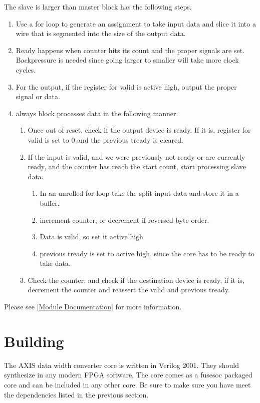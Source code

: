 \par
The slave is larger than master block has the following steps.
\begin{enumerate}
\item Use a for loop to generate an assignment to take input data and slice it into a wire that is segmented into the size of the output data.
\item Ready happens when counter hits its count and the proper signals are set. Backpressure is needed since going larger to smaller will take more clock cycles.
\item For the output, if the register for valid is active high, output the proper signal or data.
\item always block processes data in the following manner.
  \begin{enumerate}
    \item Once out of reset, check if the output device is ready. If it is, register for valid is set to 0 and the previous tready is cleared.
    \item If the input is valid, and we were previously not ready or are currently ready, and the counter has reach the start count, start processing slave data.
    \begin{enumerate}
      \item In an unrolled for loop take the split input data and store it in a buffer.
      \item increment counter, or decrement if reversed byte order.
      \item Data is valid, so set it active high
      \item previous tready is set to active high, since the core has to be ready to take data.
    \end{enumerate}
    \item Check the counter, and check if the destination device is ready, if it is, decrement the counter and reassert the valid and previous tready.
  \end{enumerate}
\end{enumerate}

Please see \ref{Module Documentation} for more information.

\section{Building}

\par
The AXIS data width converter core is written in Verilog 2001. They should synthesize in any modern FPGA software. The core comes as a fusesoc packaged core and can be
included in any other core. Be sure to make sure you have meet the dependencies listed in the previous section.

